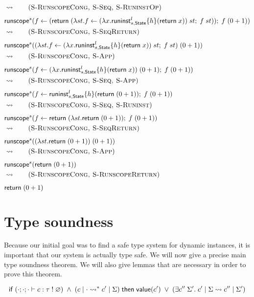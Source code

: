 {\begin{align*}
& \opsem{} \tag{\textsc{S-RunscopeCong, S-Seq, S-RuninstOp}} \\
& \chandlec{s}{\cdo{f}{(\creturn{(\vabs{st}{\cdo{f}{\capp{(\vabs{x}{\chandlei{l}{s,\mathsf{State}}{h}{\creturn{x}}})}{st}}{\capp{f}{st}}})})}{\capp{f}{(0 + 1)}}} \\
& \opsem{} \tag{\textsc{S-RunscopeCong, S-SeqReturn}} \\
& \chandlec{s}{\capp{(\vabs{st}{\cdo{f}{\capp{(\vabs{x}{\chandlei{l}{s,\mathsf{State}}{h}{\creturn{x}}})}{st}}{\capp{f}{st}}})}{(0 + 1)}} \\
& \opsem{} \tag{\textsc{S-RunscopeCong, S-App}} \\
& \chandlec{s}{\cdo{f}{\capp{(\vabs{x}{\chandlei{l}{s,\mathsf{State}}{h}{\creturn{x}}})}{(0 + 1)}}{\capp{f}{(0 + 1)}}} \\
& \opsem{} \tag{\textsc{S-RunscopeCong, S-Seq, S-App}} \\
& \chandlec{s}{\cdo{f}{\chandlei{l}{s,\mathsf{State}}{h}{\creturn{(0 + 1)}}}{\capp{f}{(0 + 1)}}} \\
& \opsem{} \tag{\textsc{S-RunscopeCong, S-Seq, S-Runinst}} \\
& \chandlec{s}{\cdo{f}{\creturn (\vabs{st}{\creturn{(0 + 1)}})}{\capp{f}{(0 + 1)}}} \\
& \opsem{} \tag{\textsc{S-RunscopeCong, S-SeqReturn}} \\
& \chandlec{s}{\capp{(\vabs{st}{\creturn{(0 + 1)}})}{(0 + 1)}} \\
& \opsem{} \tag{\textsc{S-RunscopeCong, S-App}} \\
& \chandlec{s}{\creturn{(0 + 1)}} \\
& \opsem{} \tag{\textsc{S-RunscopeCong, S-RunscopeReturn}} \\
& \creturn{(0 + 1)}
\end{align*}

\section{Type soundness}
\label{sec:theorems}

Because our initial goal was to find a safe type system for dynamic instances, it is important that our system is actually type safe.
We will now give a precise main type soundness theorem.
We will also give lemmas that are necessary in order to prove this theorem.

\begin{theorem}
\[
	\mathsf{if}\;
		(\cdot;\cdot;\cdot \vdash c : \tau \; ! \; \varnothing)
		\;\land\;
		(c \;|\; \cdot \rightsquigarrow^* c' \;|\; \Sigma)
	\;\mathsf{then}\;
		\mathsf{value}(c')
		\;\lor\;
		(\exists c'' \; \Sigma'.\; c' \;|\; \Sigma \rightsquigarrow c'' \;|\; \Sigma')
\]
\end{theorem}

}
